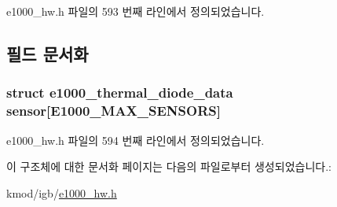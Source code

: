 e1000\+\_\+hw.\+h 파일의 593 번째 라인에서 정의되었습니다.



\subsection{필드 문서화}
\subsubsection[{\texorpdfstring{sensor}{sensor}}]{\setlength{\rightskip}{0pt plus 5cm}struct {\bf e1000\+\_\+thermal\+\_\+diode\+\_\+data} sensor\mbox{[}E1000\+\_\+\+M\+A\+X\+\_\+\+S\+E\+N\+S\+O\+RS\mbox{]}}\hypertarget{structe1000__thermal__sensor__data_a40dd5ca367c2a5b1cd406e6288ebee4f}{}\label{structe1000__thermal__sensor__data_a40dd5ca367c2a5b1cd406e6288ebee4f}


e1000\+\_\+hw.\+h 파일의 594 번째 라인에서 정의되었습니다.



이 구조체에 대한 문서화 페이지는 다음의 파일로부터 생성되었습니다.\+:\begin{DoxyCompactItemize}
\item 
kmod/igb/\hyperlink{kmod_2igb_2e1000__hw_8h}{e1000\+\_\+hw.\+h}\end{DoxyCompactItemize}
